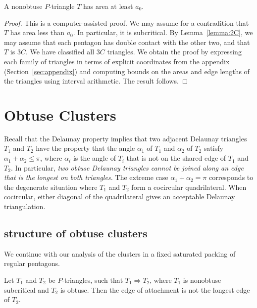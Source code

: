 \begin{lemma}\label{lemma:a0}  
A nonobtuse $P$-triangle $T$ has area at least $a_0$.
\end{lemma}

\begin{proof} This is a computer-assisted proof.  We may assume for a
  contradition that $T$ has area less than $a_0$.  In particular, it
  is subcritical.  By Lemma~\ref{lemma:2C}, we may assume that each
  pentagon has double contact with the other two, and that $T$ is
  $3C$.  We have classified all $3C$ triangles.  We obtain the proof
by expressing each family of triangles in terms of explicit
coordinates from the appendix (Section~\ref{sec:appendix}) and
computing bounds on the areas and edge lengths of the triangles using
interval arithmetic.  The result follows.
\end{proof}

\section{Obtuse Clusters}\label{sec:obtuse}



\begin{remark}\label{rem:delaunay}
  Recall that the Delaunay property implies that two adjacent Delaunay
  triangles $T_1$ and $T_2$ have the property that the angle
  $\alpha_1$ of $T_1$ and $\alpha_2$ of $T_2$ satisfy $\alpha_1 +
  \alpha_2\le \pi$, where $\alpha_i$ is the angle of $T_i$ that is not
  on the shared edge of $T_1$ and $T_2$.  In particular, {\it two
    obtuse Delaunay triangles cannot be joined along an edge that is
    the longest on both triangles.}  The extreme case
  $\alpha_1+\alpha_2=\pi$ corresponds to the degenerate situation
  where $T_1$ and $T_2$ form a cocircular quadrilateral. When
  cocircular, either diagonal of the quadrilateral gives an acceptable
  Delaunay triangulation.
\end{remark}

\subsection{structure of obtuse clusters}

We continue with our analysis of the clusters in a fixed saturated
packing of regular pentagons.  

\begin{lemma}\label{lemma:notlong}  
Let $T_1$ and $T_2$ be $P$-triangles, such that $T_1\Rightarrow T_2$, where $T_1$ is nonobtuse subcritical and
  $T_2$ is obtuse.  Then the edge of attachment is not the longest
  edge of $T_2$.
\end{lemma}

